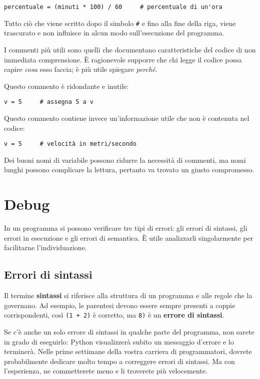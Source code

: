 \documentclass[10pt]{book}
\begin{document}
\begin{verbatim}
percentuale = (minuti * 100) / 60     # percentuale di un'ora
\end{verbatim}
%
Tutto ciò che viene scritto dopo il simbolo {\tt \#} e fino alla fine della riga, viene trascurato e non influisce in alcun modo sull'esecuzione del programma. 

I commenti più utili sono quelli che documentano caratteristiche del codice di non immediata comprensione. È ragionevole supporre che chi legge il codice possa capire {\em cosa} esso faccia; è più utile spiegare {\em perché}.

Questo commento è ridondante e inutile:

\begin{verbatim}
v = 5     # assegna 5 a v
\end{verbatim}
%
Questo commento contiene invece un'informazione utile che non è contenuta nel codice:

\begin{verbatim}
v = 5     # velocità in metri/secondo 
\end{verbatim}
%
Dei buoni nomi di variabile possono ridurre la necessità di commenti, ma nomi lunghi possono complicare la lettura, pertanto va trovato un giusto compromesso.


\section{Debug}

In un programma si possono verificare tre tipi di errori: gli errori di sintassi, gli errori in esecuzione e gli errori di semantica. È utile analizzarli singolarmente per facilitarne l'individuazione.

\subsection{Errori di sintassi}

Il termine {\bf sintassi} si riferisce alla struttura di un programma e alle regole che la governano. Ad esempio, le parentesi devono essere sempre presenti a coppie corrispondenti, così {\tt (1 + 2)} è corretto, ma {\tt 8)} è un {\bf errore di sintassi}.

Se c'è anche un solo errore di sintassi in qualche parte del programma, non sarete in grado di eseguirlo: Python visualizzerà subito un messaggio d'errore e lo terminerà. Nelle prime settimane della vostra carriera di programmatori, dovrete probabilmente dedicare molto tempo a correggere errori di sintassi. Ma con l'esperienza, ne commetterete meno e li troverete più velocemente.
\end{document}
